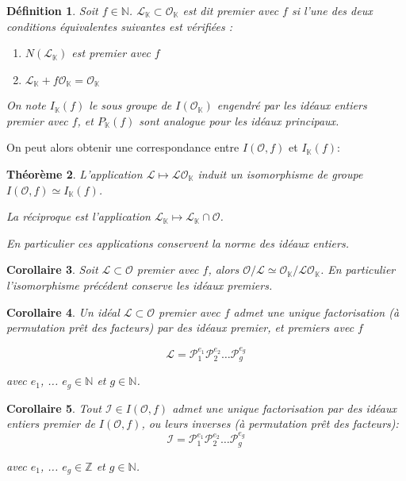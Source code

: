 \documentclass{article}
\newcommand{\N}[0]{\mathbb{N}}
\newcommand{\Z}[0]{\mathbb{Z}}
\newcommand{\K}[0]{\mathbb{K}}
\newcommand{\OR}[0]{\mathcal{O}}
\newcommand{\LR}[0]{\mathcal{L}}
\newcommand{\PR}[0]{\mathcal{P}}
\newcommand{\IR}[0]{\mathcal{I}}
\newtheorem{The}{Théorème}[section]
\newtheorem{Def}[The]{Définition}
\newtheorem{Coro}[The]{Corollaire}
\begin{document}
\begin{Def}
	Soit $f\in\N$. $\LR_{\K}\subset\OR_{\K}$ est dit premier avec $f$ si l'une des deux conditions équivalentes suivantes est vérifiées :
	
	\begin{enumerate}
		\item $N(\LR_{\K})$ est premier avec $f$
		\item $\LR_{\K} + f\OR_{\K} = \OR_{\K}$
	\end{enumerate}
	
	On note $I_{\K}(f)$ le sous groupe de $I(\OR_{\K})$ engendré par les idéaux entiers premier avec $f$, et $P_{\K}(f)$ sont analogue pour les idéaux principaux. 
\end{Def}

On peut alors obtenir une correspondance entre $I(\OR, f)$ et $I_{\K}(f)$:

\begin{The}
	L'application $\LR\mapsto\LR\OR_{\K}$ induit un isomorphisme de groupe $I(\OR, f)\simeq I_{\K}(f)$.
	
	La réciproque est l'application $\LR_{\K}\mapsto\LR_{\K}\cap\OR$.
	
	En particulier ces applications conservent la norme des idéaux entiers. 
\end{The}

\begin{Coro}
	Soit $\LR\subset\OR$ premier avec $f$, alors $\OR/\LR \simeq \OR_{\K}/\LR\OR_{\K}$. En particulier l'isomorphisme précédent conserve les idéaux premiers. 
\end{Coro}

\begin{Coro}
	Un idéal $\LR\subset\OR$ premier avec $f$ admet une unique factorisation (à permutation prêt des facteurs) par des idéaux premier, et premiers avec $f$
	
	\begin{equation*}
		\LR = \PR_{1}^{e_{1}}\PR_{2}^{e_{2}}\ldots\PR_{g}^{e_{g}}
	\end{equation*}
	
	avec $e_{1}$, ... $e_{g}\in\N$ et $g\in\N$.
	
\end{Coro}

\begin{Coro}
	Tout $\IR \in I(\OR,f)$ admet une unique factorisation par des idéaux entiers premier de $I(\OR,f)$, ou leurs inverses (à permutation prêt des facteurs):
	\begin{equation*}
		\IR = \PR_{1}^{e_{1}}\PR_{2}^{e_{2}}\ldots\PR_{g}^{e_{g}}
	\end{equation*}
		
	avec $e_{1}$, ... $e_{g}\in\Z$ et $g\in\N$.
		

\end{Coro}
\end{document}
